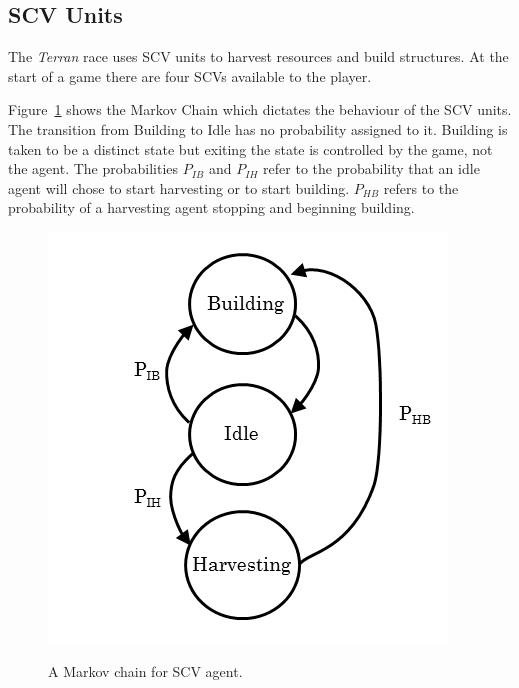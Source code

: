 \subsection{SCV Units}

The \textit{Terran} race uses SCV units to harvest resources and build structures. At the start of a game there are four SCVs available to the player.

Figure~\ref{fig:scv_diagram} shows the Markov Chain which dictates the behaviour of the SCV units. The transition from Building to Idle has no probability assigned to it. Building is taken to be a distinct state but exiting the state is controlled by the game, not the agent. The probabilities \(P_{IB}\) and \(P_{IH}\) refer to the probability that an idle agent will chose to start harvesting or to start building. \(P_{HB}\) refers to the probability of a harvesting agent stopping and beginning building.

\begin{figure}
\centering
\includegraphics[scale=0.8, trim = 0cm 0cm 0cm 0cm]{diagrams/scv}
\label{fig:scv_diagram}
\caption{A Markov chain for SCV agent.}
\end{figure}